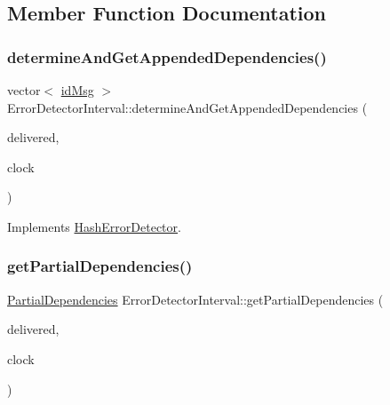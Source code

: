 \subsection{Member Function Documentation}
\mbox{\label{classErrorDetectorInterval_a6cb5dc28ef7349060d15727e92a6780a}} 
\subsubsection{\texorpdfstring{determine\+And\+Get\+Appended\+Dependencies()}{determineAndGetAppendedDependencies()}}
{\footnotesize\ttfamily vector$<$ \hyperlink{structures_8h_a83a1d9a070efa5341da84cfd8e28d3e5}{id\+Msg} $>$ Error\+Detector\+Interval\+::determine\+And\+Get\+Appended\+Dependencies (\begin{DoxyParamCaption}\item[{const vector$<$ \hyperlink{structures_8h_a7e7bdc1d2fff8a9436f2f352b2711ed6}{message\+Info} $>$ \&}]{delivered,  }\item[{const \hyperlink{classProbabilisticClock}{Probabilistic\+Clock} \&}]{clock }\end{DoxyParamCaption})\hspace{0.3cm}{\ttfamily [virtual]}}



Implements \hyperlink{classHashErrorDetector_ae45353331e29b50a0aa2fc6dd540ed4e}{Hash\+Error\+Detector}.

\mbox{\label{classErrorDetectorInterval_a9494a918f551eb1efcab39ffd68316d6}} 
\subsubsection{\texorpdfstring{get\+Partial\+Dependencies()}{getPartialDependencies()}}
{\footnotesize\ttfamily \hyperlink{classPartialDependencies}{Partial\+Dependencies} Error\+Detector\+Interval\+::get\+Partial\+Dependencies (\begin{DoxyParamCaption}\item[{const vector$<$ \hyperlink{structures_8h_a7e7bdc1d2fff8a9436f2f352b2711ed6}{message\+Info} $>$ \&}]{delivered,  }\item[{const \hyperlink{classProbabilisticClock}{Probabilistic\+Clock} \&}]{clock }\end{DoxyParamCaption})\hspace{0.3cm}{\ttfamily [virtual]}}



